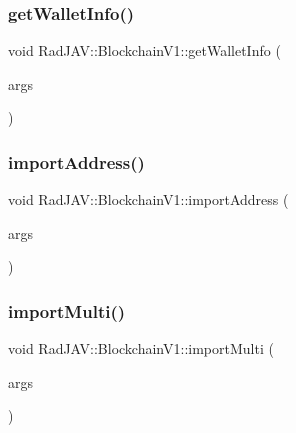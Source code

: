 \subsubsection{\texorpdfstring{get\+Wallet\+Info()}{getWalletInfo()}}
{\footnotesize\ttfamily void Rad\+J\+A\+V\+::\+Blockchain\+V1\+::get\+Wallet\+Info (\begin{DoxyParamCaption}\item[{const v8\+::\+Function\+Callback\+Info$<$ v8\+::\+Value $>$ \&}]{args }\end{DoxyParamCaption})\hspace{0.3cm}{\ttfamily [static]}}

\mbox{\label{class_rad_j_a_v_1_1_blockchain_v1_ac093bac81cd721b8cc99926fc4d79586}} 
\subsubsection{\texorpdfstring{import\+Address()}{importAddress()}}
{\footnotesize\ttfamily void Rad\+J\+A\+V\+::\+Blockchain\+V1\+::import\+Address (\begin{DoxyParamCaption}\item[{const v8\+::\+Function\+Callback\+Info$<$ v8\+::\+Value $>$ \&}]{args }\end{DoxyParamCaption})\hspace{0.3cm}{\ttfamily [static]}}

\mbox{\label{class_rad_j_a_v_1_1_blockchain_v1_a8aceb19da2d2e4c30ed82ee8663bffe7}} 
\subsubsection{\texorpdfstring{import\+Multi()}{importMulti()}}
{\footnotesize\ttfamily void Rad\+J\+A\+V\+::\+Blockchain\+V1\+::import\+Multi (\begin{DoxyParamCaption}\item[{const v8\+::\+Function\+Callback\+Info$<$ v8\+::\+Value $>$ \&}]{args }\end{DoxyParamCaption})\hspace{0.3cm}{\ttfamily [static]}}

